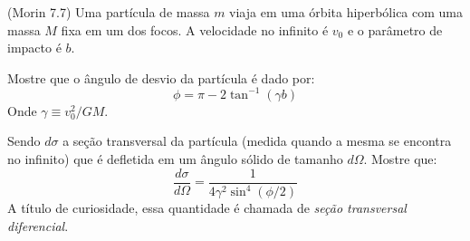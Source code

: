 \documentclass[11pt]{article}
\begin{document}
\begin{pproblem} (Morin 7.7) Uma partícula de massa \(m\) viaja em uma órbita hiperbólica com uma massa \(M\) fixa em um dos focos. A velocidade no infinito é \(v_0\) e o parâmetro de impacto é \(b\).
    \begin{alternativas}
    \item Mostre que o ângulo de desvio da partícula é dado por:
    \[
    \phi = \pi-2\tan^{-1}(\gamma b)
    \]
    Onde \(\gamma \equiv v_0^2/GM\).
    \item Sendo \(d\sigma\) a seção transversal da partícula (medida quando a mesma se encontra no infinito) que é defletida em um ângulo sólido de tamanho \(d\Omega\). Mostre que:
    \[
    \frac{d\sigma}{d\Omega} = \frac{1}{4\gamma^2\sin^4(\phi/2)}
    \] 
    A título de curiosidade, essa quantidade é chamada de \textit{seção transversal diferencial}.
    \end{alternativas}

    
\end{pproblem}
\end{document}
